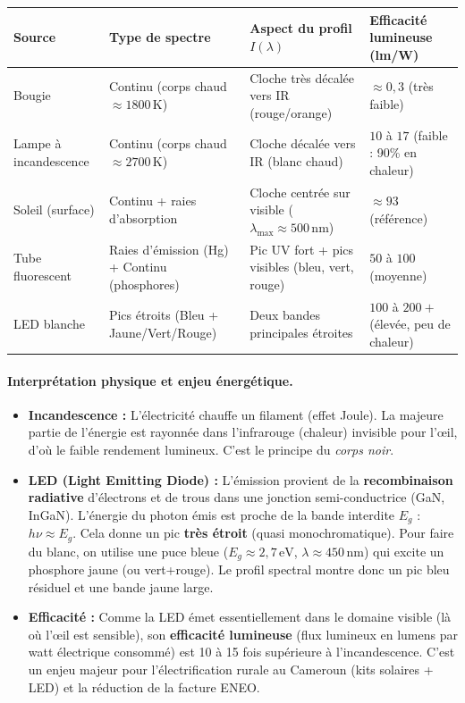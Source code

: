 \documentclass[11pt]{article}
\begin{document}
\begin{center}
\begin{tabularx}{\linewidth}{|l|X|X|X|}
\hline
\rowcolor{popblueL}
\textbf{Source} & \textbf{Type de spectre} & \textbf{Aspect du profil $I(\lambda)$} & \textbf{Efficacité lumineuse (lm/W)} \\
\hline
Bougie & Continu (corps chaud $\approx 1800\,\text{K}$) & Cloche très décalée vers IR (rouge/orange) & $\approx 0,3$ (très faible) \\
\hline
Lampe à incandescence & Continu (corps chaud $\approx 2700\,\text{K}$) & Cloche décalée vers IR (blanc chaud) & $10$ à $17$ (faible : 90\% en chaleur) \\
\hline
Soleil (surface) & Continu + raies d'absorption & Cloche centrée sur visible ($\lambda_{\text{max}}\approx 500\,\text{nm}$) & $\approx 93$ (référence) \\
\hline
Tube fluorescent & Raies d'émission (Hg) + Continu (phosphores) & Pic UV fort + pics visibles (bleu, vert, rouge) & $50$ à $100$ (moyenne) \\
\hline
LED blanche & Pics étroits (Bleu + Jaune/Vert/Rouge) & Deux bandes principales étroites & $100$ à $200+$ (élevée, peu de chaleur) \\
\hline
\end{tabularx}
\end{center}

\paragraph{Interprétation physique et enjeu énergétique.}
\begin{itemize}
    \item \textbf{Incandescence :} L'électricité chauffe un filament (effet Joule). La majeure partie de l'énergie est rayonnée dans l'infrarouge (chaleur) invisible pour l'œil, d'où le faible rendement lumineux. C'est le principe du \emph{corps noir}.
    \item \textbf{LED (Light Emitting Diode) :} L'émission provient de la \textbf{recombinaison radiative} d'électrons et de trous dans une jonction semi-conductrice (GaN, InGaN). L'énergie du photon émis est proche de la bande interdite $E_g$ : $h\nu \approx E_g$. Cela donne un pic \textbf{très étroit} (quasi monochromatique). Pour faire du blanc, on utilise une puce bleue ($E_g \approx 2,7\,\text{eV}$, $\lambda \approx 450\,\text{nm}$) qui excite un phosphore jaune (ou vert+rouge). Le profil spectral montre donc un pic bleu résiduel et une bande jaune large.
    \item \textbf{Efficacité :} Comme la LED émet essentiellement dans le domaine visible (là où l'œil est sensible), son \textbf{efficacité lumineuse} (flux lumineux en lumens par watt électrique consommé) est 10 à 15 fois supérieure à l'incandescence. C'est un enjeu majeur pour l'électrification rurale au Cameroun (kits solaires + LED) et la réduction de la facture ENEO.
\end{itemize}
\end{document}
